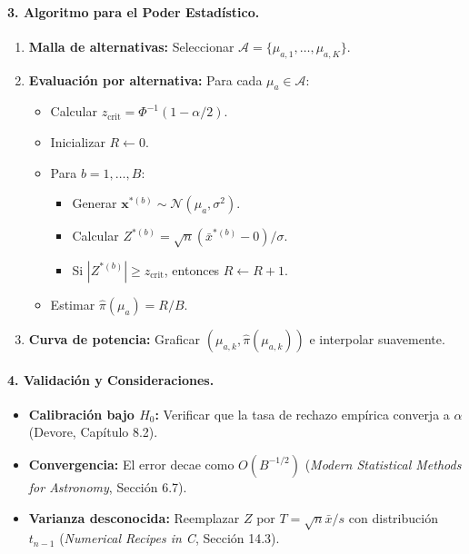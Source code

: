 \documentclass[12pt]{article}
\begin{document}
\paragraph{3. Algoritmo para el Poder Estadístico.}
\begin{enumerate}
    \item \textbf{Malla de alternativas:} Seleccionar $\mathcal{A} = \{\mu_{a,1}, \dots, \mu_{a,K}\}$.
    
    \item \textbf{Evaluación por alternativa:} Para cada $\mu_a \in \mathcal{A}$:
    \begin{itemize}
        \item Calcular $z_{\text{crit}} = \Phi^{-1}(1 - \alpha/2)$.
        \item Inicializar $R \leftarrow 0$.
        \item Para $b = 1,\dots,B$:
        \begin{itemize}
            \item Generar $\mathbf{x}^{*(b)} \sim \mathcal{N}(\mu_a, \sigma^2)$.
            \item Calcular $Z^{*(b)} = \sqrt{n}(\bar{x}^{*(b)} - 0)/\sigma$.
            \item Si $|Z^{*(b)}| \geq z_{\text{crit}}$, entonces $R \leftarrow R + 1$.
        \end{itemize}
        \item Estimar $\hat{\pi}(\mu_a) = R/B$.
    \end{itemize}
    
    \item \textbf{Curva de potencia:} Graficar $(\mu_{a,k}, \hat{\pi}(\mu_{a,k}))$ e interpolar suavemente.
\end{enumerate}

\paragraph{4. Validación y Consideraciones.}
\begin{itemize}
    \item \textbf{Calibración bajo $H_0$:} Verificar que la tasa de rechazo empírica converja a $\alpha$ (Devore, Capítulo 8.2).
    \item \textbf{Convergencia:} El error decae como $O(B^{-1/2})$ (\textit{Modern Statistical Methods for Astronomy}, Sección 6.7).
    \item \textbf{Varianza desconocida:} Reemplazar $Z$ por $T = \sqrt{n}\bar{x}/s$ con distribución $t_{n-1}$ (\textit{Numerical Recipes in C}, Sección 14.3).
\end{itemize}
\end{document}
